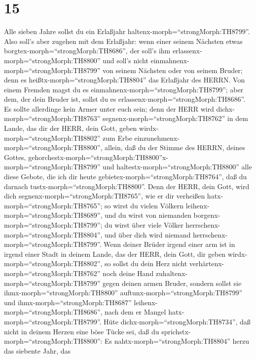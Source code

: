 \hypertarget{section-14}{%
\section{15}\label{section-14}}

 Alle sieben Jahre sollst du ein Erlaßjahr
haltenx-morph=``strongMorph:TH8799''.  Also soll's aber
zugehen mit dem Erlaßjahr: wenn einer seinem Nächsten etwas
borgtex-morph=``strongMorph:TH8686'', der soll's ihm
erlassenx-morph=``strongMorph:TH8800'' und soll's nicht
einmahnenx-morph=``strongMorph:TH8799'' von seinem Nächsten oder von
seinem Bruder; denn es heißtx-morph=``strongMorph:TH8804'' das Erlaßjahr
des HERRN.  Von einem Fremden magst du es
einmahnenx-morph=``strongMorph:TH8799''; aber dem, der dein Bruder ist,
sollst du es erlassenx-morph=``strongMorph:TH8686''.  Es
sollte allerdinge kein Armer unter euch sein; denn der HERR wird
dichx-morph=``strongMorph:TH8763'' segnenx-morph=``strongMorph:TH8762''
in dem Lande, das dir der HERR, dein Gott, geben
wirdx-morph=``strongMorph:TH8802'' zum Erbe
einzunehmenx-morph=``strongMorph:TH8800'',  allein, daß du
der Stimme des HERRN, deines Gottes,
gehorchestx-morph=``strongMorph:TH8800''x-morph=``strongMorph:TH8799''
und haltestx-morph=``strongMorph:TH8800'' alle diese Gebote, die ich dir
heute gebietex-morph=``strongMorph:TH8764'', daß du darnach
tustx-morph=``strongMorph:TH8800''.  Denn der HERR, dein
Gott, wird dich segnenx-morph=``strongMorph:TH8765'', wie er dir
verheißen hatx-morph=``strongMorph:TH8765''; so wirst du vielen Völkern
leihenx-morph=``strongMorph:TH8689'', und du wirst von niemanden
borgenx-morph=``strongMorph:TH8799''; du wirst über viele Völker
herrschenx-morph=``strongMorph:TH8804'', und über dich wird niemand
herrschenx-morph=``strongMorph:TH8799''.  Wenn deiner Brüder
irgend einer arm ist in irgend einer Stadt in deinem Lande, das der
HERR, dein Gott, dir geben wirdx-morph=``strongMorph:TH8802'', so sollst
du dein Herz nicht verhärtenx-morph=``strongMorph:TH8762'' noch deine
Hand zuhaltenx-morph=``strongMorph:TH8799'' gegen deinen armen Bruder,
 sondern sollst sie ihmx-morph=``strongMorph:TH8800''
auftunx-morph=``strongMorph:TH8799'' und
ihmx-morph=``strongMorph:TH8687'' leihenx-morph=``strongMorph:TH8686'',
nach dem er Mangel hatx-morph=``strongMorph:TH8799''.  Hüte
dichx-morph=``strongMorph:TH8734'', daß nicht in deinem Herzen eine böse
Tücke sei, daß du sprichstx-morph=``strongMorph:TH8800'': Es
nahtx-morph=``strongMorph:TH8804'' herzu das siebente Jahr, das

